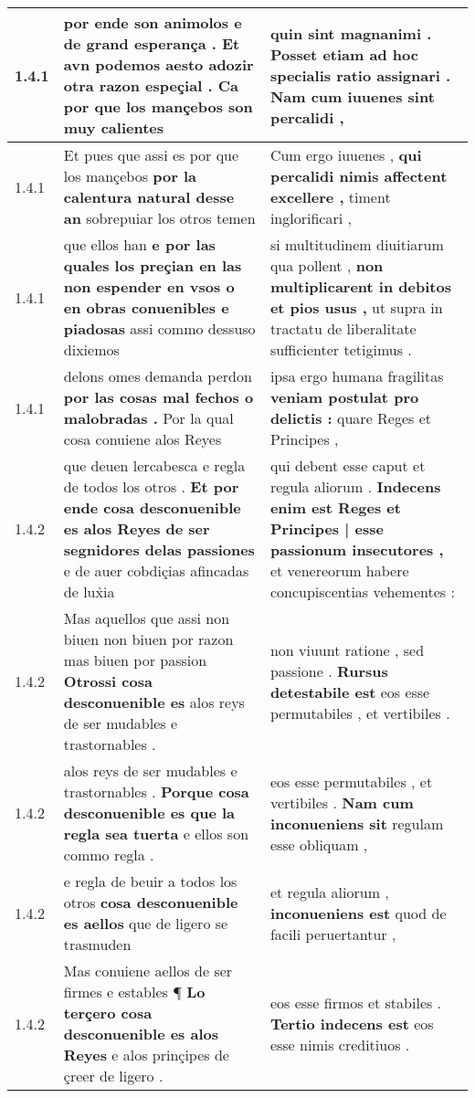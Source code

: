 \begin{tabular}{|p{1cm}|p{6.5cm}|p{6.5cm}|}
1.4.1 & por ende son animolos e de grand esperança . \textbf{ Et avn podemos aesto adozir otra razon espeçial . } Ca por que los mançebos son muy calientes & quin sint magnanimi . \textbf{ Posset etiam ad hoc specialis ratio assignari . } Nam cum iuuenes sint percalidi , \\\hline
1.4.1 & Et pues que assi es por que los mançebos \textbf{ por la calentura natural desse an } sobrepuiar los otros temen & Cum ergo iuuenes , \textbf{ qui percalidi nimis affectent excellere , } timent inglorificari , \\\hline
1.4.1 & que ellos han \textbf{ e por las quales los preçian en las non espender en vsos o en obras conuenibles e piadosas } assi commo dessuso dixiemos & si multitudinem diuitiarum qua pollent , \textbf{ non multiplicarent in debitos et pios usus , } ut supra in tractatu de liberalitate sufficienter tetigimus . \\\hline
1.4.1 & delons omes demanda perdon \textbf{ por las cosas mal fechos o malobradas . } Por la qual cosa conuiene alos Reyes & ipsa ergo humana fragilitas \textbf{ veniam postulat pro delictis : } quare Reges et Principes , \\\hline
1.4.2 & que deuen lercabesca e regla de todos los otros . \textbf{ Et por ende cosa desconuenible es alos Reyes de ser segnidores delas passiones } e de auer cobdiçias afincadas de lux̉ia & qui debent esse caput et regula aliorum . \textbf{ Indecens enim est Reges et Principes | esse passionum insecutores , } et venereorum habere concupiscentias vehementes : \\\hline
1.4.2 & Mas aquellos que assi non biuen non biuen por razon mas biuen por passion \textbf{ Otrossi cosa desconuenible es } alos reys de ser mudables e trastornables . & non viuunt ratione , sed passione . \textbf{ Rursus detestabile est } eos esse permutabiles , et vertibiles . \\\hline
1.4.2 & alos reys de ser mudables e trastornables . \textbf{ Porque cosa desconuenible es que la regla sea tuerta } e ellos son commo regla . & eos esse permutabiles , et vertibiles . \textbf{ Nam cum inconueniens sit } regulam esse obliquam , \\\hline
1.4.2 & e regla de beuir a todos los otros \textbf{ cosa desconuenible es aellos } que de ligero se trasmuden & et regula aliorum , \textbf{ inconueniens est } quod de facili peruertantur , \\\hline
1.4.2 & Mas conuiene aellos de ser firmes e estables ¶ \textbf{ Lo terçero cosa desconuenible es alos Reyes } e alos prinçipes de çreer de ligero . & eos esse firmos et stabiles . \textbf{ Tertio indecens est } eos esse nimis creditiuos . \\\hline

\end{tabular}

